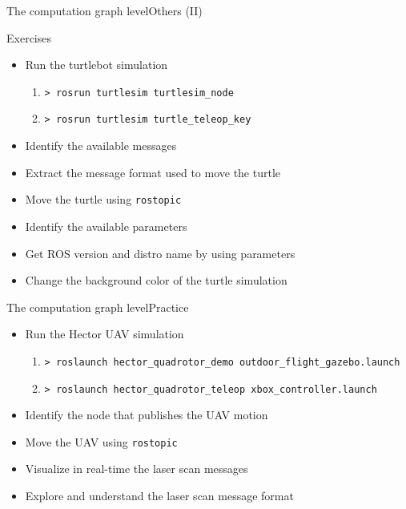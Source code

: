 \documentclass[10pt,compress]{beamer} %
\begin{document}
\begin{frame}{The computation graph level}{Others (II)}
	\begin{block}{Exercises}
  	\begin{itemize}
		\item Run the turtlebot simulation
			\begin{enumerate}
			\item \texttt{> rosrun turtlesim turtlesim\_node}
			\item \texttt{> rosrun turtlesim turtle\_teleop\_key}
			\end{enumerate}
		\item Identify the available messages
		\item Extract the message format used to move the turtle
		\item Move the turtle using \texttt{rostopic}
		\item Identify the available parameters
		\item Get ROS version and distro name by using parameters
		\item Change the background color of the turtle simulation
	\end{itemize}
	\end{block}
\end{frame}

\begin{frame}{The computation graph level}{Practice}
	\begin{itemize}
		\item Run the Hector UAV simulation
		\begin{enumerate}
			\item \texttt{> roslaunch hector\_quadrotor\_demo outdoor\_flight\_gazebo.launch}
			\item \texttt{> roslaunch hector\_quadrotor\_teleop xbox\_controller.launch}
		\end{enumerate}
		\item Identify the node that publishes the UAV motion
		\item Move the UAV using \texttt{rostopic}
		\item Visualize in real-time the laser scan messages
		\item Explore and understand the laser scan message format
	\end{itemize}
\end{frame}
\end{document}
